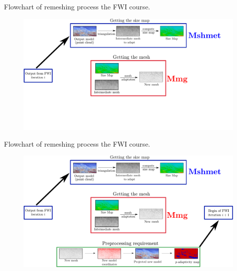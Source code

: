 \begin{frame}[noframenumbering]{Flowchart of remeshing process the FWI course.}

  \begin{figure}[htbp!]
    \vspace{-0.7cm}
  \centering
  \includegraphics[scale=0.36]{image/remesh_workflow2.pdf}
  \label{flowchart_remesh}
\end{figure}
\end{frame}


\begin{frame}[noframenumbering]{Flowchart of remeshing process the FWI course.}

  \begin{figure}[htbp!]
    \vspace{-0.7cm}
  \centering
  \includegraphics[scale=0.36]{image/remesh_workflow.pdf}
  \label{flowchart_remesh}
\end{figure}
\end{frame}





